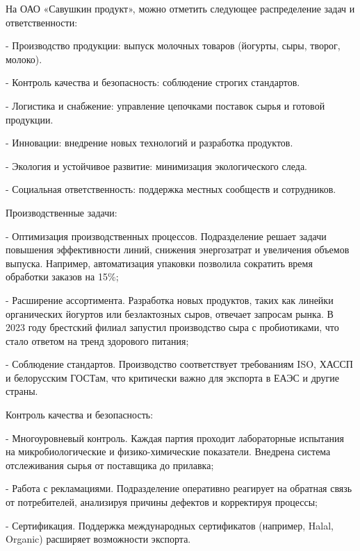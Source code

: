 {\gostFont
	
	\par \redline На ОАО «Савушкин продукт», можно отметить следующее распределение задач и ответственности:
	\par \redline - Производство продукции: выпуск молочных товаров (йогурты, сыры, творог, молоко).
	\par \redline - Контроль качества и безопасность: соблюдение строгих стандартов.
	\par \redline - Логистика и снабжение: управление цепочками поставок сырья и готовой продукции.
	\par \redline - Инновации: внедрение новых технологий и разработка продуктов.
	\par \redline - Экология и устойчивое развитие: минимизация экологического следа.
	\par \redline - Социальная ответственность: поддержка местных сообществ и сотрудников.
	
	\par \redline Производственные задачи:
	
	\par \redline - Оптимизация производственных процессов. Подразделение решает задачи повышения эффективности линий, снижения энергозатрат и увеличения объемов выпуска. Например, автоматизация упаковки позволила сократить время обработки заказов на 15\%;
	\par \redline - Расширение ассортимента. Разработка новых продуктов, таких как линейки органических йогуртов или безлактозных сыров, отвечает запросам рынка. В 2023 году брестский филиал запустил производство сыра с пробиотиками, что стало ответом на тренд здорового питания;
	\par \redline - Соблюдение стандартов. Производство соответствует требованиям ISO, ХАССП и белорусским ГОСТам, что критически важно для экспорта в ЕАЭС и другие страны.
	
	\par \redline Контроль качества и безопасность:
	
	\par \redline - Многоуровневый контроль. Каждая партия проходит лабораторные испытания на микробиологические и физико-химические показатели. Внедрена система отслеживания сырья от поставщика до прилавка;
	\par \redline - Работа с рекламациями. Подразделение оперативно реагирует на обратная связь от потребителей, анализируя причины дефектов и корректируя процессы;
	\par \redline - Сертификация. Поддержка международных сертификатов (например, Halal,\\ Organic) расширяет возможности экспорта.
	
}
